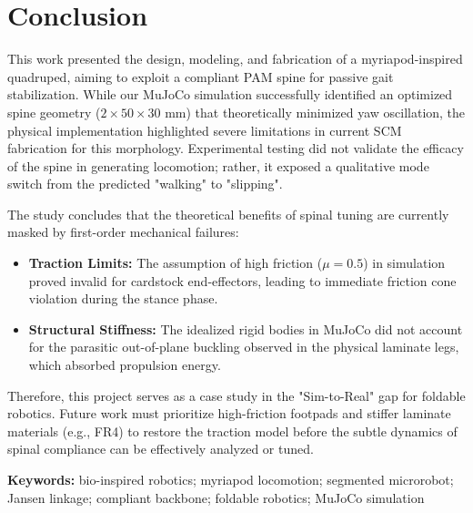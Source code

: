 \documentclass[11pt, a4paper]{article}
\begin{document}
\section{Conclusion}
\label{sec:conclusion}

This work presented the design, modeling, and fabrication of a myriapod-inspired quadruped, aiming to exploit a compliant PAM spine for passive gait stabilization.
While our MuJoCo simulation successfully identified an optimized spine geometry ($2 \times 50 \times 30$ mm) that theoretically minimized yaw oscillation, the physical implementation highlighted severe limitations in current SCM fabrication for this morphology.
Experimental testing did not validate the efficacy of the spine in generating locomotion; rather, it exposed a qualitative mode switch from the predicted "walking" to "slipping".

The study concludes that the theoretical benefits of spinal tuning are currently masked by first-order mechanical failures:
\begin{itemize}
    \item \textbf{Traction Limits:} The assumption of high friction ($\mu=0.5$) in simulation proved invalid for cardstock end-effectors, leading to immediate friction cone violation during the stance phase.
    \item \textbf{Structural Stiffness:} The idealized rigid bodies in MuJoCo did not account for the parasitic out-of-plane buckling observed in the physical laminate legs, which absorbed propulsion energy.
\end{itemize}
Therefore, this project serves as a case study in the "Sim-to-Real" gap for foldable robotics.
Future work must prioritize high-friction footpads and stiffer laminate materials (e.g., FR4) to restore the traction model before the subtle dynamics of spinal compliance can be effectively analyzed or tuned.


\bigskip
\noindent\textbf{Keywords:} bio-inspired robotics; myriapod locomotion; segmented microrobot; Jansen linkage; compliant backbone; foldable robotics; MuJoCo simulation

\clearpage
\end{document}
